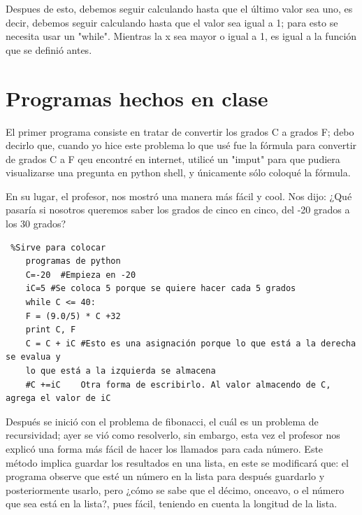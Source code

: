 \documentclass{book}
\begin{document}
		Despues de esto, debemos seguir calculando hasta que el último valor sea uno, es decir, debemos seguir calculando hasta que el valor sea igual a 1; para esto se necesita usar un "while".
		Mientras la x sea mayor o igual a 1, es igual a la función que se definió antes.

	\section{Programas hechos en clase}
	El primer programa consiste en tratar de convertir los grados C a grados F; debo decirlo que, cuando yo hice este problema lo que usé fue la fórmula para convertir de grados C a F qeu encontré en internet, utilicé un "imput" para que pudiera visualizarse una pregunta en python shell, y únicamente sólo coloqué la fórmula.
	
	En su lugar, el profesor, nos mostró una manera más fácil y cool. 
	Nos dijo: ¿Qué pasaría si nosotros queremos saber los grados de cinco en cinco, del -20 grados a los 30 grados?
	
	\begin{verbatim} %Sirve para colocar 
	programas de python
	C=-20  #Empieza en -20
	iC=5 #Se coloca 5 porque se quiere hacer cada 5 grados
	while C <= 40:
	F = (9.0/5) * C +32
	print C, F
	C = C + iC #Esto es una asignación porque lo que está a la derecha se evalua y 
	lo que está a la izquierda se almacena
	#C +=iC    Otra forma de escribirlo. Al valor almacendo de C, agrega el valor de iC
	\end{verbatim}
	
	Después se inició con el problema de fibonacci, el cuál es un problema de recursividad; ayer se vió como resolverlo, sin embargo, esta vez el profesor nos explicó una forma más fácil de hacer los llamados para cada número. 
	Este método implica guardar los resultados en una lista, en este se modificará que: el programa observe que esté un número en la lista para después guardarlo y posteriormente usarlo, pero ¿cómo se sabe que el décimo, onceavo, o el número que sea está en la lista?, pues fácil, teniendo en cuenta la longitud de la lista.
	
\end{document}
